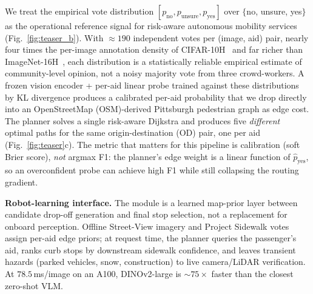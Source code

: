 \documentclass{article}
\begin{document}
We treat the empirical vote distribution $[p_{\mathrm{no}}, p_{\mathrm{unsure}}, p_{\mathrm{yes}}]$ over $\{$no, unsure, yes$\}$ as the operational reference signal for risk-aware autonomous mobility services (Fig.~\ref{fig:teaser_b}). With $\approx 190$ independent votes per (image, aid) pair, nearly four times the per-image annotation density of CIFAR-10H~\citep{peterson2019humanuncertainty} and far richer than ImageNet-16H~\citep{steyvers2022bayesian}, each distribution is a statistically reliable empirical estimate of community-level opinion, not a noisy majority vote from three crowd-workers. A frozen vision encoder + per-aid linear probe trained against these distributions by KL divergence produces a calibrated per-aid probability that we drop directly into an OpenStreetMap (OSM)-derived Pittsburgh pedestrian graph as edge cost. The planner solves a single risk-aware Dijkstra and produces five \emph{different} optimal paths for the same origin-destination (OD) pair, one per aid (Fig.~\ref{fig:teaser}c). The metric that matters for this pipeline is calibration (soft Brier score), \emph{not} argmax F1: the planner's edge weight is a linear function of $\hat{p}_\mathrm{yes}$, so an overconfident probe can achieve high F1 while still collapsing the routing gradient.


\textbf{Robot-learning interface.} The module is a learned map-prior layer between candidate drop-off generation and final stop selection, not a replacement for onboard perception. Offline Street-View imagery and Project Sidewalk votes assign per-aid edge priors; at request time, the planner queries the passenger's aid, ranks curb stops by downstream sidewalk confidence, and leaves transient hazards (parked vehicles, snow, construction) to live camera/LiDAR verification. At $78.5$\,ms/image on an A100, DINOv2-large is ${\sim}75\times$ faster than the closest zero-shot VLM.
\end{document}
